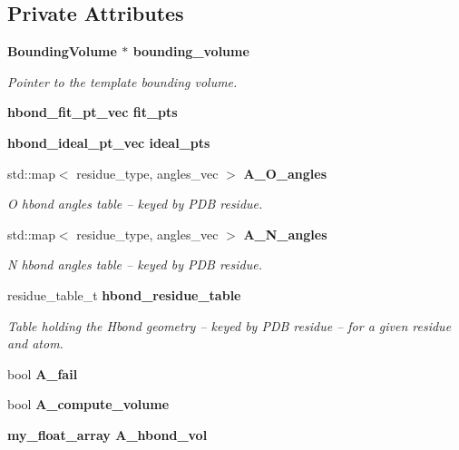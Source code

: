 \subsection*{Private Attributes}
\begin{CompactItemize}
\item 
\bf{Bounding\-Volume} $\ast$ \bf{bounding\_\-volume}\label{classSimSite3D_1_1HbondPoints_b8bd71a270952792930378c3ff38468b}

\begin{CompactList}\small\item\em Pointer to the template bounding volume. \item\end{CompactList}\item 
\bf{hbond\_\-fit\_\-pt\_\-vec} \textbf{fit\_\-pts}\label{classSimSite3D_1_1HbondPoints_d57a41a394ef6493da286ca08693e4e7}

\item 
\bf{hbond\_\-ideal\_\-pt\_\-vec} \textbf{ideal\_\-pts}\label{classSimSite3D_1_1HbondPoints_35657ed1abbe90e1ba27730d228c184d}

\item 
std::map$<$ residue\_\-type, angles\_\-vec $>$ \bf{A\_\-O\_\-angles}\label{classSimSite3D_1_1HbondPoints_c8dbf8d8fe8853dd5e8b507cd67a4c7e}

\begin{CompactList}\small\item\em O hbond angles table -- keyed by PDB residue. \item\end{CompactList}\item 
std::map$<$ residue\_\-type, angles\_\-vec $>$ \bf{A\_\-N\_\-angles}\label{classSimSite3D_1_1HbondPoints_324506b3ad239e15f1f82c4b7219ca6a}

\begin{CompactList}\small\item\em N hbond angles table -- keyed by PDB residue. \item\end{CompactList}\item 
residue\_\-table\_\-t \bf{hbond\_\-residue\_\-table}\label{classSimSite3D_1_1HbondPoints_45a1db04f743d2c692fc6c84be45765f}

\begin{CompactList}\small\item\em Table holding the Hbond geometry -- keyed by PDB residue -- for a given residue and atom. \item\end{CompactList}\item 
bool \textbf{A\_\-fail}\label{classSimSite3D_1_1HbondPoints_4cae614e34c14cde3be1c4c794944c87}

\item 
bool \textbf{A\_\-compute\_\-volume}\label{classSimSite3D_1_1HbondPoints_1314acbf5e42587a66484b4c37e766e2}

\item 
\bf{my\_\-float\_\-array} \textbf{A\_\-hbond\_\-vol}\label{classSimSite3D_1_1HbondPoints_806e96a34dca894dadb4b5b97fbb4117}

\end{CompactItemize}
